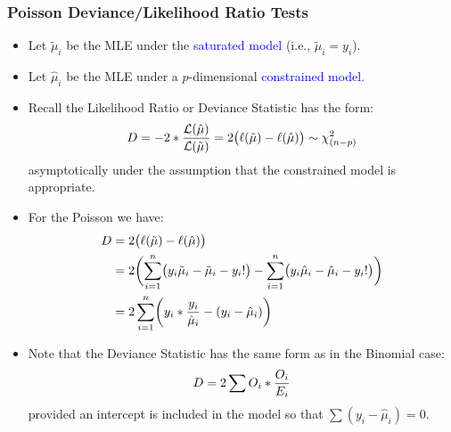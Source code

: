\documentclass[oneside]{book}\usepackage[]{graphicx}\usepackage[svgnames]{xcolor}
\let\log\relax%
\begin{document}
\subsubsection*{Poisson Deviance/Likelihood Ratio Tests}
\begin{itemize}
      \item Let $ \tilde{\mu}_i $ be the MLE under the \textcolor{Blue}{saturated model} (i.e., $ \tilde{\mu}_i=y_i $).
      \item Let $ \hat{\mu}_i $ be the MLE under a $ p $-dimensional \textcolor{Blue}{constrained model}.
      \item Recall the Likelihood Ratio or Deviance Statistic has the form:
            \[ D=-2\log*{\frac{\mathcal{L}(\hat{\mu})}{\mathcal{L}(\tilde{\mu})}}=2\bigl(\ell(\tilde{\mu})-\ell(\hat{\mu})\bigr)\sim \chi^2_{(n-p)} \]
            asymptotically under the assumption that the constrained model is appropriate.
      \item For the Poisson we have:
            \begin{align*}
                  D
                   & =2\bigl(\ell(\tilde{\mu})-\ell(\hat{\mu})\bigr)                                                                                                                   \\
                   & =2\biggl(\sum_{i=1}^{n} \bigl(y_i\log{\tilde{\mu}_i}-\tilde{\mu}_i-\log{y_i!}\bigr)-\sum_{i=1}^{n} \bigl(y_i\log{\hat{\mu}_i}-\hat{\mu}_i-\log{y_i!}\bigr)\biggr) \\
                   & =2 \sum_{i=1}^{n}\biggl(y_i\log*{\frac{y_i}{\hat{\mu}_i}}-(y_i-\hat{\mu}_i)\biggr)
            \end{align*}
      \item Note that the Deviance Statistic has the same form as in the Binomial case:
            \[ D=2\sum O_i\log*{\frac{O_i}{E_i}} \]
            provided an intercept is included in the model so that $ \sum (y_i-\hat{\mu}_i)=0 $.
\end{itemize}
\end{document}
